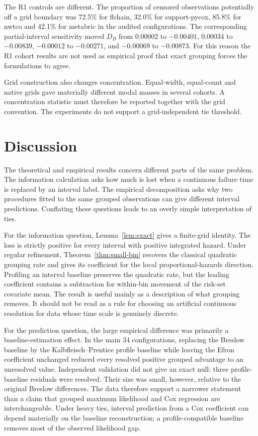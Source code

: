 \documentclass[smallextended,natbib]{svjour3}
\begin{document}
The R1 controls are different. The proportion of censored observations potentially off a grid boundary was 72.5\% for flchain, 32.0\% for support-pycox, 85.8\% for nwtco and 42.1\% for metabric in the audited configurations. The corresponding partial-interval sensitivity moved $D_B$ from 0.00002 to $-0.00401$, 0.00034 to $-0.00839$, $-0.00012$ to $-0.00271$, and $-0.00069$ to $-0.00873$. For this reason the R1 cohort results are not used as empirical proof that exact grouping forces the formulations to agree.

Grid construction also changes concentration. Equal-width, equal-count and native grids gave materially different modal masses in several cohorts. A concentration statistic must therefore be reported together with the grid convention. The experiments do not support a grid-independent tie threshold.

\section{Discussion}
\label{sec:discussion}

The theoretical and empirical results concern different parts of the same problem. The information calculation asks how much is lost when a continuous failure time is replaced by an interval label. The empirical decomposition asks why two procedures fitted to the same grouped observations can give different interval predictions. Conflating these questions leads to an overly simple interpretation of ties.

For the information question, Lemma~\ref{lem:exact} gives a finite-grid identity. The loss is strictly positive for every interval with positive integrated hazard. Under regular refinement, Theorem~\ref{thm:small-bin} recovers the classical quadratic grouping rate and gives its coefficient for the local proportional-hazards direction. Profiling an interval baseline preserves the quadratic rate, but the leading coefficient contains a subtraction for within-bin movement of the risk-set covariate mean. The result is useful mainly as a description of what grouping removes. It should not be read as a rule for choosing an artificial continuous resolution for data whose time scale is genuinely discrete.

For the prediction question, the large empirical difference was primarily a baseline-estimation effect. In the main 34 configurations, replacing the Breslow baseline by the Kalbfleisch--Prentice profile baseline while leaving the Efron coefficient unchanged reduced every resolved positive grouped advantage to an unresolved value. Independent validation did not give an exact null: three profile-baseline residuals were resolved. Their size was small, however, relative to the original Breslow differences. The data therefore support a narrower statement than a claim that grouped maximum likelihood and Cox regression are interchangeable. Under heavy ties, interval prediction from a Cox coefficient can depend materially on the baseline reconstruction; a profile-compatible baseline removes most of the observed likelihood gap.
\end{document}
